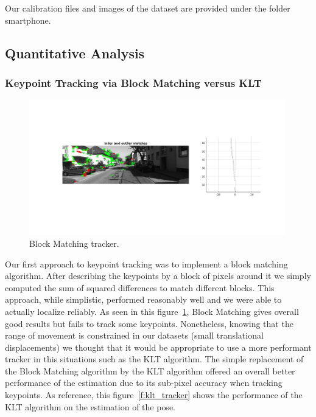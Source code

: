 Our calibration files and images of the dataset are provided under the folder smartphone.








\subsection{Quantitative Analysis}
\subsubsection{Keypoint Tracking via Block Matching versus KLT}

\begin{figure}
  \includegraphics[width=0.99\textwidth]{files/block_tracker.jpg}
  \caption[\label{f:block_tracker} Block Matching tracker]{Block Matching tracker.}
\end{figure}

Our first approach to keypoint tracking was to implement a block matching algorithm. After describing the keypoints by a block of pixels around it
we simply computed the sum of squared differences to match different blocks. This approach, while simplistic, performed reasonably well and we
were able to actually localize reliably. As seen in this figure~\ref{f:block_tracker}, Block Matching gives overall good results but fails to
track some keypoints.
Nonetheless, knowing that the range of movement is constrained in our datasets (small translational displacements) we thought that it would be appropriate to use a more performant tracker in this situations such as the KLT algorithm.
The simple replacement of the Block Matching algorithm by the KLT algorithm offered an overall better performance of the estimation due to its sub-pixel accuracy when tracking keypoints. As reference, this figure~\ref{f:klt_tracker} shows the performance of the KLT algorithm on the estimation of the pose.

